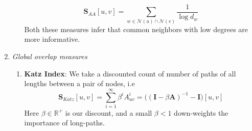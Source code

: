 \begin{enumerate}
\begin{enumerate}
\begin{equation}
	\mathbf{S}_{AA}[u, v] = \sum_{w \in \mathcal{N}(u) \cap \mathcal{N}(v)} \dfrac{1}{\log d_w}
\end{equation}
Both these measures infer that common neighbors with low degrees are more informative.
\end{enumerate}
\item \textit{Global overlap measures}
\begin{enumerate}
	\item \textbf{Katz Index}: We take a discounted count of number of paths of all lengths between a pair of nodes, i.e
	\begin{equation}
		\mathbf{S}_{Katz}[u, v] = \sum_{i=1}^\infty \beta^i A_{uv}^i = \Big((\mathbf{I} - \beta \mathbf{A})^{-1} - \mathbf{I}\Big)[u,v]
	\end{equation}
	Here $\beta \in \mathbb{R}^+$ is our discount, and a small $\beta < 1$ down-weights the importance of long-paths.
\end{enumerate}
\end{enumerate}